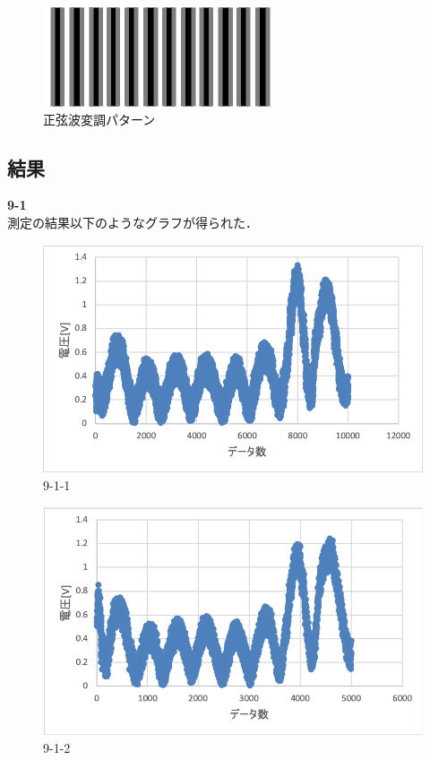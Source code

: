 \documentclass[11pt, a4paper,twocolumn]{jarticle}
\begin{document}
\begin{figure}[ht]
 \begin{center}
  \includegraphics[width=0.8\linewidth]{fig10.png}
 \end{center}
 \caption{正弦波変調パターン}
 \label{fig:10}
\end{figure}

\subsection{結果}
\noindent
\textbf{9-1} \\
測定の結果以下のようなグラフが得られた．

\begin{figure}[ht]
 \begin{center}
  \includegraphics[width=0.8\linewidth]{fig11.png}
 \end{center}
 \caption{9-1-1}
 \label{fig:11}
\end{figure}

\begin{figure}[ht]
 \begin{center}
  \includegraphics[width=0.8\linewidth]{fig12.png}
 \end{center}
 \caption{9-1-2}
 \label{fig:12}
\end{figure}
\end{document}
